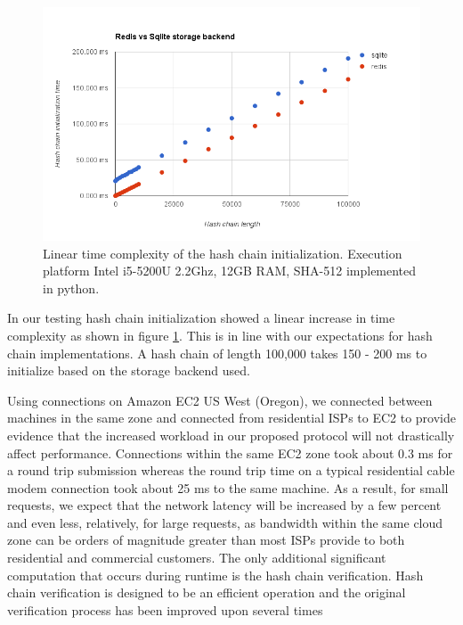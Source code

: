 \documentclass{sig-alternate-05-2015}
\begin{document}
\begin{figure}[h]
\includegraphics[scale=0.365]{performance}
\caption{Linear time complexity of the hash chain initialization. Execution platform Intel i5-5200U 2.2Ghz, 12GB RAM, SHA-512 implemented in python.}
\label{fig:performance}
\end{figure}

In our testing hash chain initialization showed a linear increase in time complexity as shown in figure \ref{fig:performance}. This is in line with our expectations for hash chain implementations. A hash chain of length 100,000 takes 150 - 200 ms to initialize based on the storage backend used. 

Using connections on Amazon EC2 US West (Oregon), we connected between machines in the same zone and connected from residential ISPs to EC2 to provide evidence that the increased workload in our proposed protocol will not drastically affect performance.  Connections within the same EC2 zone took about 0.3 ms for a round trip submission whereas the round trip time on a typical residential cable modem connection took about 25 ms to the same machine.  As a result, for small requests, we expect that the network latency will be increased by a few percent and even less, relatively, for large requests, as bandwidth within the same cloud zone can be orders of magnitude greater than most ISPs provide to both residential and commercial customers.  The only additional significant computation that occurs during runtime is the hash chain verification.  Hash chain verification is designed to be an efficient operation and the original verification process has been improved upon several times \cite{fischlin_fast_2004, yum_fast_2010}
\end{document}
